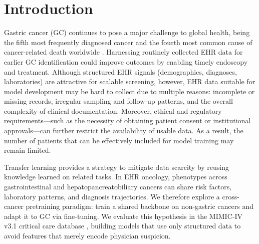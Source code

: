 \documentclass[diagnostics,article,submit,pdftex,moreauthors]{Definitions/mdpi}
\begin{document}
\section{Introduction}
Gastric cancer (GC) continues to pose a major challenge to global health, being the fifth most frequently diagnosed cancer and the fourth most common cause of cancer-related death worldwide \cite{sung2021global}. 
Harnessing routinely collected EHR data for earlier GC identification could improve outcomes by enabling timely endoscopy and treatment.
Although structured EHR signals (demographics, diagnoses, laboratories) are attractive for scalable screening,
however, EHR data suitable for model development may be hard to collect due to multiple reasons: incomplete or missing records, irregular sampling and follow-up patterns, and the overall complexity of clinical documentation.
Moreover, ethical and regulatory requirements—such as the necessity of obtaining patient consent or institutional approvals—can further restrict the availability of usable data.
As a result, the number of patients that can be effectively included for model training may remain limited.

Transfer learning provides a strategy to mitigate data scarcity by reusing knowledge learned on related tasks.
In EHR oncology, phenotypes across gastrointestinal and hepatopancreatobiliary cancers can share risk factors, laboratory patterns, and diagnosis trajectories.
We therefore explore a cross-cancer pretraining paradigm: train a shared backbone on non-gastric cancers and adapt it to GC via fine-tuning.
We evaluate this hypothesis in the MIMIC-IV v3.1 critical care database \citep{Johnson2024MIMICIV}, building models that use only structured data to avoid features that merely encode physician suspicion.


\end{document}
